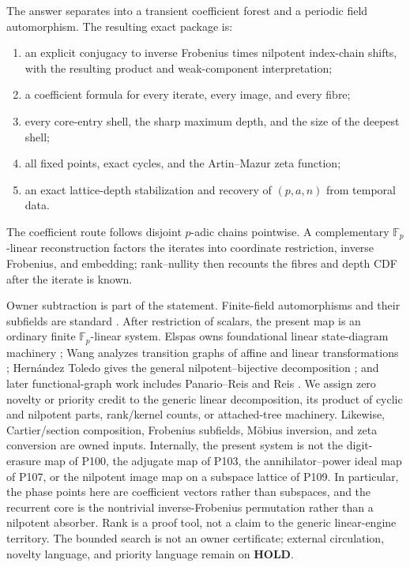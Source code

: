 \documentclass[10pt,a4paper]{amsart}
\theoremstyle{definition}
\theoremstyle{remark}
\newcommand{\F}{\mathbb F}
\begin{document}
The answer separates into a transient coefficient forest and a periodic
field automorphism.  The resulting exact package is:
\begin{enumerate}
\item an explicit conjugacy to inverse Frobenius times nilpotent index-chain
      shifts, with the resulting product and weak-component interpretation;
\item a coefficient formula for every iterate, every image, and every fibre;
\item every core-entry shell, the sharp maximum depth, and the size of the
      deepest shell;
\item all fixed points, exact cycles, and the Artin--Mazur zeta function;
\item an exact lattice-depth stabilization and recovery of $(p,a,n)$ from
      temporal data.
\end{enumerate}
The coefficient route follows disjoint $p$-adic chains pointwise.  A
complementary $\F_p$-linear reconstruction factors the iterates into
coordinate restriction, inverse Frobenius, and embedding; rank--nullity then
recounts the fibres and depth CDF after the iterate is known.

Owner subtraction is part of the statement.  Finite-field automorphisms and
their subfields are standard \cite{LidlNiederreiter1997}.  After restriction
of scalars, the present map is an ordinary finite $\F_p$-linear system.
Elspas owns foundational linear state-diagram machinery \cite{Elspas1959};
Wang analyzes transition graphs of affine and linear transformations
\cite{Wang1967}; Hern\'andez Toledo gives the general nilpotent--bijective
decomposition \cite{HernandezToledo2005}; and later functional-graph work
includes Panario--Reis and Reis \cite{PanarioReis2019,Reis2023}.  We assign
zero novelty or priority credit to the generic linear decomposition, its
product of cyclic and nilpotent parts, rank/kernel counts, or attached-tree
machinery.  Likewise, Cartier/section composition, Frobenius subfields,
M\"obius inversion, and zeta conversion are owned inputs.  Internally, the
present system is not the digit-erasure
map of P100, the adjugate map of P103, the annihilator--power ideal map of
P107, or the nilpotent image map on a subspace lattice of P109.  In
particular, the phase points here are coefficient vectors rather than
subspaces, and the recurrent core is the nontrivial inverse-Frobenius
permutation rather than a nilpotent absorber.  Rank is a proof tool, not a
claim to the generic linear-engine territory.  The bounded search is not an
owner certificate; external circulation, novelty language, and priority
language remain on \textbf{HOLD}.
\end{document}
